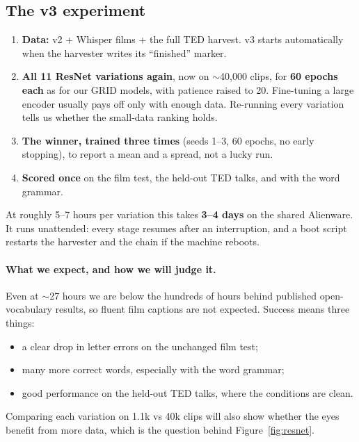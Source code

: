 \documentclass[11pt,a4paper]{article}
\begin{document}
\subsection{The v3 experiment}
\begin{enumerate}
  \item \textbf{Data:} v2 + Whisper films + the full TED harvest. v3 starts automatically when
  the harvester writes its ``finished'' marker.
  \item \textbf{All 11 ResNet variations again}, now on $\sim$40,000 clips, for \textbf{60 epochs
  each} as for our GRID models, with patience raised to 20. Fine-tuning a large encoder usually
  pays off only with enough data. Re-running every variation tells us whether the small-data
  ranking holds.
  \item \textbf{The winner, trained three times} (seeds 1--3, 60 epochs, no early stopping), to
  report a mean and a spread, not a lucky run.
  \item \textbf{Scored once} on the film test, the held-out TED talks, and with the word grammar.
\end{enumerate}
At roughly 5--7 hours per variation this takes \textbf{3--4 days} on the shared Alienware. It
runs unattended: every stage resumes after an interruption, and a boot script restarts the
harvester and the chain if the machine reboots.

\paragraph{What we expect, and how we will judge it.}
Even at $\sim$27 hours we are below the hundreds of hours behind published open-vocabulary
results, so fluent film captions are not expected. Success means three things:
\begin{itemize}
  \item a clear drop in letter errors on the unchanged film test;
  \item many more correct words, especially with the word grammar;
  \item good performance on the held-out TED talks, where the conditions are clean.
\end{itemize}
Comparing each variation on 1.1k vs 40k clips will also show whether the eyes benefit from
more data, which is the question behind Figure~\ref{fig:resnet}.

\end{document}

